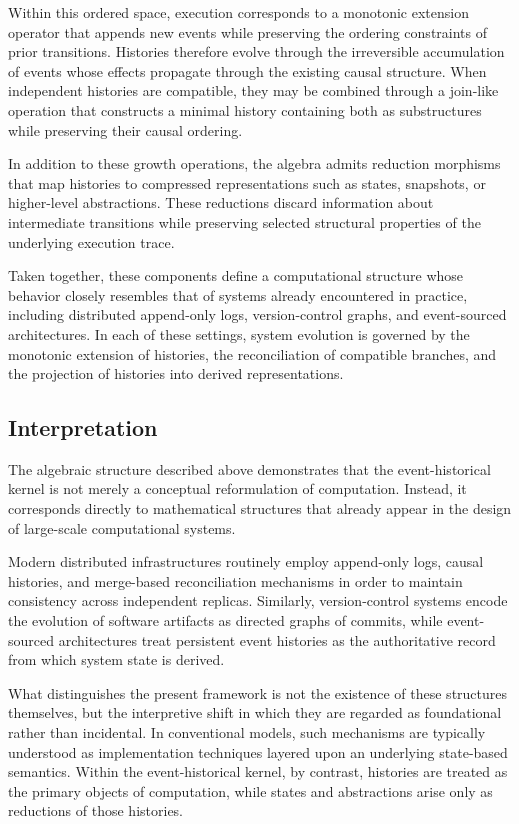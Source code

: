 \documentclass[12pt]{article}
\begin{document}
Within this ordered space, execution corresponds to a
monotonic extension operator that appends new events
while preserving the ordering constraints of prior
transitions. Histories therefore evolve through the
irreversible accumulation of events whose effects
propagate through the existing causal structure.
When independent histories are compatible, they may
be combined through a join-like operation that
constructs a minimal history containing both as
substructures while preserving their causal ordering.

In addition to these growth operations, the algebra
admits reduction morphisms that map histories to
compressed representations such as states, snapshots,
or higher-level abstractions. These reductions discard
information about intermediate transitions while
preserving selected structural properties of the
underlying execution trace.

Taken together, these components define a computational
structure whose behavior closely resembles that of
systems already encountered in practice, including
distributed append-only logs, version-control graphs,
and event-sourced architectures. In each of these
settings, system evolution is governed by the monotonic
extension of histories, the reconciliation of compatible
branches, and the projection of histories into derived
representations.

\subsection{Interpretation}

The algebraic structure described above demonstrates
that the event-historical kernel is not merely a
conceptual reformulation of computation. Instead, it
corresponds directly to mathematical structures that
already appear in the design of large-scale computational
systems.

Modern distributed infrastructures routinely employ
append-only logs, causal histories, and merge-based
reconciliation mechanisms in order to maintain
consistency across independent replicas. Similarly,
version-control systems encode the evolution of
software artifacts as directed graphs of commits,
while event-sourced architectures treat persistent
event histories as the authoritative record from
which system state is derived.

What distinguishes the present framework is not the
existence of these structures themselves, but the
interpretive shift in which they are regarded as
foundational rather than incidental. In conventional
models, such mechanisms are typically understood as
implementation techniques layered upon an underlying
state-based semantics. Within the event-historical
kernel, by contrast, histories are treated as the
primary objects of computation, while states and
abstractions arise only as reductions of those
histories.
\end{document}
